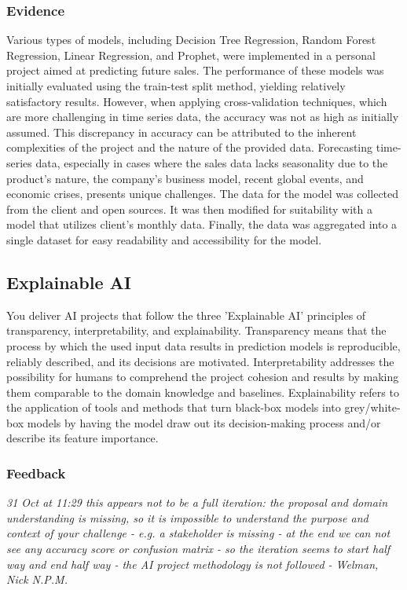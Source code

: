 \documentclass[a4paper, 11pt]{article}
\begin{document}
\subsubsection{Evidence}
Various types of models, including Decision Tree Regression, Random Forest Regression, Linear Regression, and Prophet, were implemented in a personal project aimed at predicting future sales. The performance of these models was initially evaluated using the train-test split method, yielding relatively satisfactory results. However, when applying cross-validation techniques, which are more challenging in time series data, the accuracy was not as high as initially assumed. This discrepancy in accuracy can be attributed to the inherent complexities of the project and the nature of the provided data. Forecasting time-series data, especially in cases where the sales data lacks seasonality due to the product's nature, the company's business model, recent global events, and economic crises, presents unique challenges. The data for the model was collected from the client and open sources. It was then modified for suitability with a model that utilizes client's monthly data. Finally, the data was aggregated into a single dataset for easy readability and accessibility for the model.



\subsection{Explainable AI}
You deliver AI projects that follow the three 'Explainable AI' principles of transparency, interpretability, and explainability. 
\medbreak
Transparency means that the process by which the used input data results in prediction models is reproducible, reliably described, and its decisions are motivated. Interpretability addresses the possibility for humans to comprehend the project cohesion and results by making them comparable to the domain knowledge and baselines. Explainability refers to the application of tools and methods that turn black-box models into grey/white-box models by having the model draw out its decision-making process and/or describe its feature importance. 
\subsubsection{Feedback}

\begin{mdframed}[backgroundcolor=gray!20, linecolor=black, linewidth=0pt, leftmargin=1cm, rightmargin=1cm, innertopmargin=10pt, innerbottommargin=10pt]
  \itshape
  31 Oct at 11:29 \smallbreak
this appears not to be a full iteration: the proposal and domain understanding is missing, so it is impossible to understand the purpose and context of your challenge - e.g. a stakeholder is missing - at the end we can not see any accuracy score or confusion matrix - so the iteration seems to start half way and end half way - the AI project methodology is not followed \smallbreak
- Welman, Nick N.P.M.
\end{mdframed}
\end{document}
